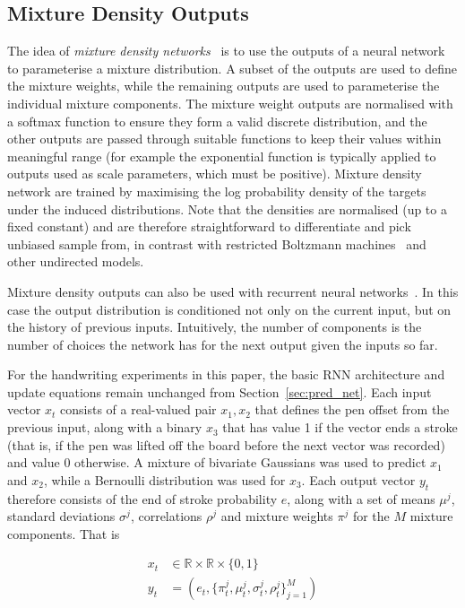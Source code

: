 \subsection{Mixture Density Outputs} The idea of \emph{mixture density networks}~\cite{bishop94mixture,bishop95book} is to use the outputs of a neural network to parameterise a mixture distribution. A subset of the outputs are used to define the mixture weights, while the remaining outputs are used to parameterise the individual mixture components. The mixture weight outputs are normalised with a softmax function to ensure they form a valid discrete distribution, and the other outputs are passed through suitable functions to keep their values within meaningful range (for example the exponential function is typically applied to outputs used as scale parameters, which must be positive). Mixture density network are trained by maximising the log probability density of the targets under the induced distributions. Note that the densities are normalised (up to a fixed constant) and are therefore straightforward to differentiate and pick unbiased sample from, in contrast with restricted Boltzmann machines~\cite{hinton10rbm} and other undirected models.

Mixture density outputs can also be used with recurrent neural networks~\cite{schuster99mixture}. In this case the output distribution is conditioned not only on the current input, but on the history of previous inputs. Intuitively, the number of components is the number of choices the network has for the next output given the inputs so far.

For the handwriting experiments in this paper, the basic RNN architecture and update equations remain unchanged from Section~\ref{sec:pred_net}. 
Each input vector $x_t$ consists of a real-valued pair $x_1,x_2$ that defines the pen offset from the previous input, along with a binary $x_3$ that has value 1 if the vector ends a stroke (that is, if the pen was lifted off the board before the next vector was recorded) and value 0 otherwise. A mixture of bivariate Gaussians was used to predict $x_1$ and $x_2$, while a Bernoulli distribution was used for $x_3$. Each output vector $y_t$ therefore consists of the end of stroke probability $e$, along with a set of means $\mu^j$, standard deviations $\sigma^j$, correlations $\rho^j$ and mixture weights $\pi^j$ for the $M$ mixture components. That is

\begin{align}
x_t &\in \mathbb{R} \times \mathbb{R} \times \{0,1\}\\
y_t &= \left(e_t,\{\pi_t^j,\mu_t^j,\sigma_t^j,\rho_t^j\}_{j=1}^M\right)
\end{align}

